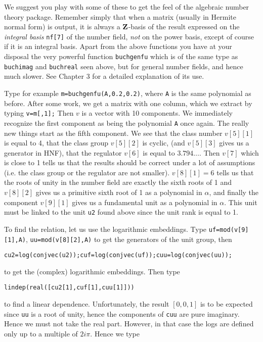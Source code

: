We suggest you play with some of these to get the feel of the algebraic
number theory package. Remember simply that when a matrix (usually in Hermite
normal form) is output, it is always a ${\bf Z}$-basis of the result expressed on
the {\it integral basis} {\tt nf[7]} of the number field, {\it not} on
the power basis, except of course if it is an integral basis.
\medskip
Apart from the above functions you have at your disposal the very powerful
function {\tt buchgenfu} which is of the same type as {\tt buchimag}
and {\tt buchreal} seen above, but for general number fields, and hence
much slower. See Chapter 3 for a detailed explanation of its use.

Type for example {\tt m=buchgenfu(A,0.2,0.2)}, where {\tt A} is the same 
polynomial as before. After some work, we get a matrix with one column, which
we extract by typing {\tt v=m[,1];} Then $v$ is a vector with 10 components.
We immediately recognize the first component as being the polynomial {\tt A}
once again. The really new things start as the fifth component. We see that the
class number $v[5][1]$ is equal to 4, that the class group $v[5][2]$ is cyclic,
(and $v[5][3]$ gives us a generator in HNF), that the regulator $v[6]$ is 
equal to $3.794\dots$. Then $v[7]$ which is close to 1 tells us that the 
results should be correct under a lot of assumptions (i.e. the class group or
the regulator are not smaller). $v[8][1]=6$ tells us that the roots of unity in
the number field are exactly the sixth roots of 1 and $v[8][2]$ gives us a 
primitive sixth root of 1 as a polynomial in $\alpha$, and finally the 
component $v[9][1]$ gives us a fundamental unit as a polynomial in $\alpha$.
This unit must be linked to the unit {\tt u2} found above since the unit
rank is equal to 1. 

To find the relation, let us use the logarithmic embeddings. Type
{\tt uf=mod(v[9][1],A)}, {\tt uu=mod(v[8][2],A)} to get the generators of the 
unit group, then 

{\tt cu2=log(conjvec(u2));cuf=log(conjvec(uf));cuu=log(conjvec(uu));}

to get the (complex) logarithmic embeddings. Then type

{\tt lindep(real([cu2[1],cuf[1],cuu[1]]))} 

to find a linear dependence. Unfortunately, the result $[0,0,1]$ is to be
expected since {\tt uu} is a root of unity, hence the components of {\tt cuu}
are pure imaginary. Hence we must not take the real part. However, in that
case the logs are defined only up to a multiple of $2i\pi$. Hence we type

